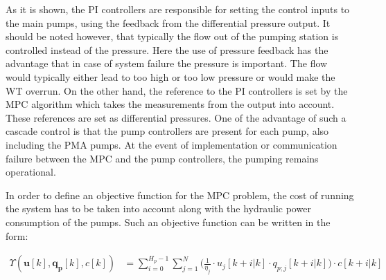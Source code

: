 As it is shown, the PI controllers are responsible for setting the control inputs to the main pumps, using the feedback from the differential pressure output. It should be noted however, that typically the flow out of the pumping station is controlled instead of the pressure. Here the use of pressure feedback has the advantage that in case of system failure the pressure is important. The flow would typically either lead to too high or too low pressure or would make the WT overrun. On the other hand, the reference to the PI controllers is set by the MPC algorithm which takes the measurements from the output into account. These references are set as differential pressures. One of the advantage of such a cascade control is that the pump controllers are present for each pump, also including the PMA pumps. At the event of implementation or communication failure between the MPC and the pump controllers, the pumping remains operational. 
 



In order to define an objective function for the MPC problem, the cost of running the system has to be taken into account along with the hydraulic power consumption of the pumps. Such an objective function can be written in the form: 

\begin{align}
 \Upsilon(\pmb{u}[k],\pmb{q_p}[k],c[k]) &=  \sum_{i=0}^{H_p-1} \sum_{j=1}^{N} \Big(\frac{1}{\eta_j} \cdot u_j[k+i|k] \cdot  q_{p;j}[k+i|k]\Big)\cdot c[k+i|k] \label{eqcost} 
\end{align}


